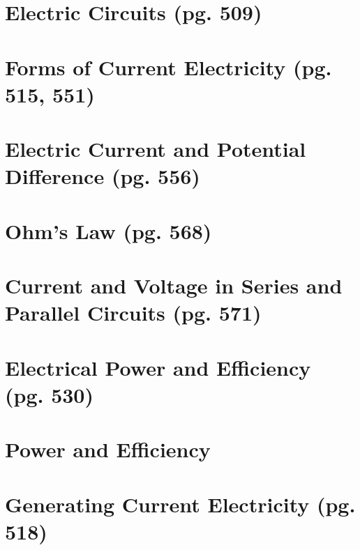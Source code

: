 \documentclass{article}
\begin{document}

\section{Electric Circuits (pg. 509)}


\section{Forms of Current Electricity (pg. 515, 551)}


\section{Electric Current and Potential Difference (pg. 556)}


\section{Ohm's Law (pg. 568)}


\section{Current and Voltage in Series and Parallel Circuits (pg. 571)}


\section{Electrical Power and Efficiency (pg. 530)}


\section{Power and Efficiency}


\section{Generating Current Electricity (pg. 518)}

\end{document}
